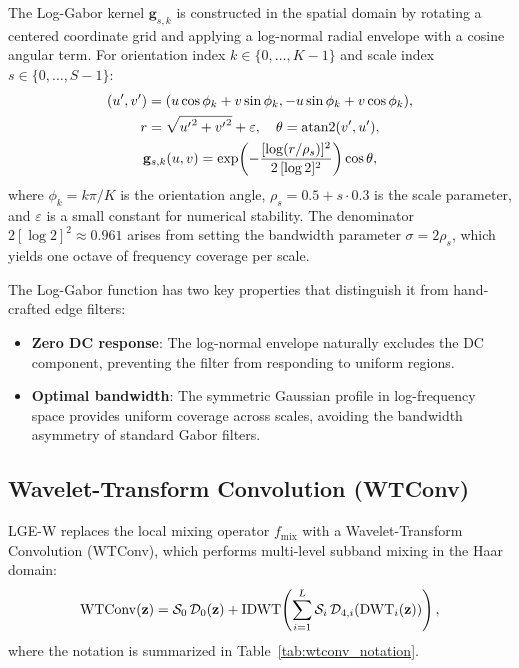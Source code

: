 \documentclass{article}
\theoremstyle{plain}
\theoremstyle{definition}
\theoremstyle{remark}
\begin{document}
The Log-Gabor kernel $\mathbf{g}_{s,k}$ is constructed in the spatial domain by rotating a centered coordinate grid and applying a log-normal radial envelope with a cosine angular term. For orientation index $k \in \{0,\ldots,K{-}1\}$ and scale index $s \in \{0,\ldots,S{-}1\}$:
\vspace{-0.2cm}
\begin{equation}
\label{eq:loggabor_appendix}
\begin{gathered}
(u',v') = (u\cos\phi_k + v\sin\phi_k, -u\sin\phi_k + v\cos\phi_k),\\
r = \sqrt{{u'}^{2}+{v'}^{2}}+\varepsilon,\quad \theta = \mathrm{atan2}(v',u'),\\
\mathbf{g}_{s,k}(u,v) = \exp\!\left(-\frac{[\log(r/\rho_s)]^{2}}{2\,[\log 2]^{2}}\right)\cos\theta,
\end{gathered}
\vspace{-0.2cm}
\end{equation}
where $\phi_k = k\pi/K$ is the orientation angle, $\rho_s = 0.5 + s \cdot 0.3$ is the scale parameter, and $\varepsilon$ is a small constant for numerical stability. The denominator $2[\log 2]^2 \approx 0.961$ arises from setting the bandwidth parameter $\sigma = 2\rho_s$, which yields one octave of frequency coverage per scale.

The Log-Gabor function has two key properties that distinguish it from hand-crafted edge filters:
\begin{itemize}
    \item \textbf{Zero DC response}: The log-normal envelope naturally excludes the DC component, preventing the filter from responding to uniform regions.
    \item \textbf{Optimal bandwidth}: The symmetric Gaussian profile in log-frequency space provides uniform coverage across scales, avoiding the bandwidth asymmetry of standard Gabor filters.
\end{itemize}

\subsection{Wavelet-Transform Convolution (WTConv)}

LGE-W replaces the local mixing operator $f_{\mathrm{mix}}$ with a Wavelet-Transform Convolution (WTConv), which performs multi-level subband mixing in the Haar domain:
\vspace{-0.2cm}
\begin{equation}
\label{eq:wtconv_appendix}
{\scriptsize
\mathrm{WTConv}(\mathbf{z}) = \mathcal{S}_0\,\mathcal{D}_0(\mathbf{z}) + \mathrm{IDWT}\!\left(\sum_{i=1}^{L} \mathcal{S}_i\,\mathcal{D}_{4,i}(\mathrm{DWT}_i(\mathbf{z}))\right),
}
\end{equation}
where the notation is summarized in Table~\ref{tab:wtconv_notation}.
\end{document}
